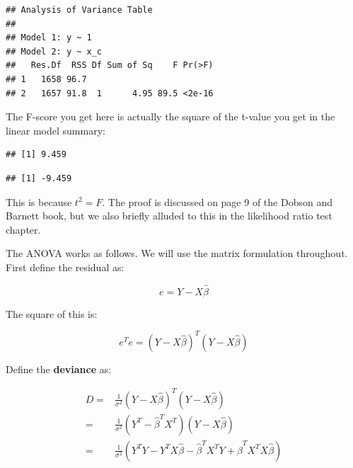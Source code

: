 \documentclass[12pt,]{krantz}
\newenvironment{Shaded}{\begin{snugshade}}{\end{snugshade}}
\newcommand{\DecValTok}[1]{\textcolor[rgb]{0.00,0.00,0.81}{#1}}
\newcommand{\KeywordTok}[1]{\textcolor[rgb]{0.13,0.29,0.53}{\textbf{#1}}}
\newcommand{\NormalTok}[1]{#1}
\newcommand{\OperatorTok}[1]{\textcolor[rgb]{0.81,0.36,0.00}{\textbf{#1}}}
\begin{document}
\begin{verbatim}
## Analysis of Variance Table
## 
## Model 1: y ~ 1
## Model 2: y ~ x_c
##   Res.Df  RSS Df Sum of Sq    F Pr(>F)
## 1   1658 96.7                         
## 2   1657 91.8  1      4.95 89.5 <2e-16
\end{verbatim}

The F-score you get here is actually the square of the t-value you get in the linear model summary:

\begin{Shaded}
\end{Shaded}

\begin{verbatim}
## [1] 9.459
\end{verbatim}

\begin{Shaded}
\end{Shaded}

\begin{verbatim}
## [1] -9.459
\end{verbatim}

This is because \(t^2 = F\). The proof is discussed on page 9 of the Dobson and Barnett book, but we also briefly alluded to this in the likelihood ratio test chapter.

The ANOVA works as follows. We will use the matrix formulation throughout. First define the residual as:

\begin{equation}
e = Y - X\hat\beta
\end{equation}

The square of this is:

\begin{equation}
e^T e = (Y - X\hat \beta)^T (Y - X\hat \beta)
\end{equation}

Define the \textbf{deviance} as:

\begin{equation}
\begin{split} \label{eq:deviance}
D =& \frac{1}{\sigma^2} (Y - X\hat \beta)^T (Y - X\hat \beta)\\
=& \frac{1}{\sigma^2}  (Y^T - \hat \beta^TX^T)(Y - X\hat \beta)\\
=& \frac{1}{\sigma^2} (Y^T Y - Y^TX\hat \beta - \hat\beta^TX^T Y + \hat\beta^TX^T  X\hat \beta)\\
\end{split}
\end{equation}
\end{document}
